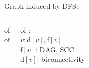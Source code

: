 
\begin{frame}{} 
  \centerline{\large Graph  induced by DFS:}

  \vspace{0.50cm}
  \begin{columns}
      \begin{center}
	 of  \\[15pt]

	 of 
      \end{center}
    \pause
      \begin{center}
	 of : \\[15pt]

	$v: \text{d}[v], \text{f}[v]$ \\[10pt]

	$\text{f}[v]$: DAG, SCC \\[10pt]

	$\text{d}[v]$: biconnectivity
      \end{center}
  \end{columns}
\end{frame}

